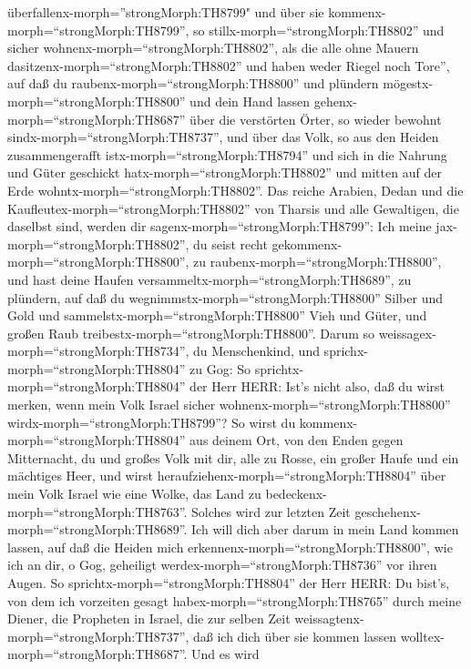 überfallenx-morph=''strongMorph:TH8799" und über sie
kommenx-morph=``strongMorph:TH8799'', so
stillx-morph=``strongMorph:TH8802'' und sicher
wohnenx-morph=``strongMorph:TH8802'', als die alle ohne Mauern
dasitzenx-morph=``strongMorph:TH8802'' und haben weder Riegel noch
Tore'',  auf daß du raubenx-morph=``strongMorph:TH8800''
und plündern mögestx-morph=``strongMorph:TH8800'' und dein Hand lassen
gehenx-morph=``strongMorph:TH8687'' über die verstörten Örter, so wieder
bewohnt sindx-morph=``strongMorph:TH8737'', und über das Volk, so aus
den Heiden zusammengerafft istx-morph=``strongMorph:TH8794'' und sich in
die Nahrung und Güter geschickt hatx-morph=``strongMorph:TH8802'' und
mitten auf der Erde wohntx-morph=``strongMorph:TH8802''. 
Das reiche Arabien, Dedan und die
Kaufleutex-morph=``strongMorph:TH8802'' von Tharsis und alle Gewaltigen,
die daselbst sind, werden dir sagenx-morph=``strongMorph:TH8799'': Ich
meine jax-morph=``strongMorph:TH8802'', du seist recht
gekommenx-morph=``strongMorph:TH8800'', zu
raubenx-morph=``strongMorph:TH8800'', und hast deine Haufen
versammeltx-morph=``strongMorph:TH8689'', zu plündern, auf daß du
wegnimmstx-morph=``strongMorph:TH8800'' Silber und Gold und
sammelstx-morph=``strongMorph:TH8800'' Vieh und Güter, und großen Raub
treibestx-morph=``strongMorph:TH8800''.  Darum so
weissagex-morph=``strongMorph:TH8734'', du Menschenkind, und
sprichx-morph=``strongMorph:TH8804'' zu Gog: So
sprichtx-morph=``strongMorph:TH8804'' der Herr HERR: Ist's nicht also,
daß du wirst merken, wenn mein Volk Israel sicher
wohnenx-morph=``strongMorph:TH8800'' wirdx-morph=``strongMorph:TH8799''?
 So wirst du kommenx-morph=``strongMorph:TH8804'' aus
deinem Ort, von den Enden gegen Mitternacht, du und großes Volk mit dir,
alle zu Rosse, ein großer Haufe und ein mächtiges Heer, 
und wirst heraufziehenx-morph=``strongMorph:TH8804'' über mein Volk
Israel wie eine Wolke, das Land zu
bedeckenx-morph=``strongMorph:TH8763''. Solches wird zur letzten Zeit
geschehenx-morph=``strongMorph:TH8689''. Ich will dich aber darum in
mein Land kommen lassen, auf daß die Heiden mich
erkennenx-morph=``strongMorph:TH8800'', wie ich an dir, o Gog, geheiligt
werdex-morph=``strongMorph:TH8736'' vor ihren Augen.  So
sprichtx-morph=``strongMorph:TH8804'' der Herr HERR: Du bist's, von dem
ich vorzeiten gesagt habex-morph=``strongMorph:TH8765'' durch meine
Diener, die Propheten in Israel, die zur selben Zeit
weissagtenx-morph=``strongMorph:TH8737'', daß ich dich über sie kommen
lassen wolltex-morph=``strongMorph:TH8687''.  Und es wird
